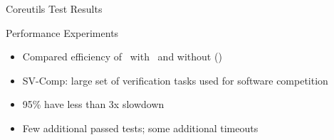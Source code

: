 \documentclass[aspectratio=169]{beamer}
\begin{document}
\begin{frame}{Coreutils Test Results}
    \centering


\end{frame}

\begin{frame}{Performance Experiments}
    \begin{itemize}
        \item Compared efficiency of \goblint\ with \cpo\ and without (\base)
        \item SV-Comp: large set of verification tasks used for software competition
        \pause
        \item 95\% have less than 3x slowdown
        \pause
        \item Few additional passed tests; some additional timeouts
    \end{itemize}
\end{frame}
\end{document}
